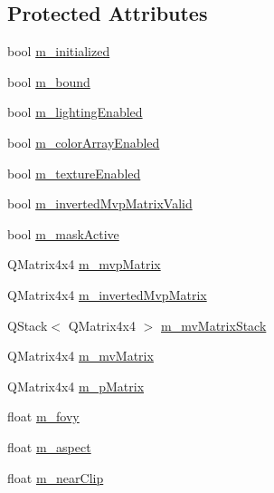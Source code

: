 \subsection*{Protected Attributes}
\begin{DoxyCompactItemize}
\item 
bool \mbox{\hyperlink{class_g_l_e_s_renderer_a2c936870131300b9ed86cf9073747637}{m\+\_\+initialized}}
\item 
bool \mbox{\hyperlink{class_g_l_e_s_renderer_ab4227a6b3394b7392c9a7001fc306ad1}{m\+\_\+bound}}
\item 
bool \mbox{\hyperlink{class_g_l_e_s_renderer_a89a023d2cabec874691841f5ff140bc8}{m\+\_\+lighting\+Enabled}}
\item 
bool \mbox{\hyperlink{class_g_l_e_s_renderer_a71b59ce0e9ae03eba0ed065bae8ecff7}{m\+\_\+color\+Array\+Enabled}}
\item 
bool \mbox{\hyperlink{class_g_l_e_s_renderer_a61680a3953bfb6b22e7131a518b1a5e2}{m\+\_\+texture\+Enabled}}
\item 
bool \mbox{\hyperlink{class_g_l_e_s_renderer_a9c58c18b9b58fb4f49bb1fd79f4a2f51}{m\+\_\+inverted\+Mvp\+Matrix\+Valid}}
\item 
bool \mbox{\hyperlink{class_g_l_e_s_renderer_a8e58a3bbfb5ba75c48cc35b06711131c}{m\+\_\+mask\+Active}}
\item 
Q\+Matrix4x4 \mbox{\hyperlink{class_g_l_e_s_renderer_a878a3ee8fe04d1a56659c78ba5e95f4b}{m\+\_\+mvp\+Matrix}}
\item 
Q\+Matrix4x4 \mbox{\hyperlink{class_g_l_e_s_renderer_af08d271c05f553df400b67685435cb0c}{m\+\_\+inverted\+Mvp\+Matrix}}
\item 
Q\+Stack$<$ Q\+Matrix4x4 $>$ \mbox{\hyperlink{class_g_l_e_s_renderer_a5675ffb62f73dc7ebff3e4aea59db56e}{m\+\_\+mv\+Matrix\+Stack}}
\item 
Q\+Matrix4x4 \mbox{\hyperlink{class_g_l_e_s_renderer_a2f8a5b98999a5ee14551a39e5f005389}{m\+\_\+mv\+Matrix}}
\item 
Q\+Matrix4x4 \mbox{\hyperlink{class_g_l_e_s_renderer_a2fe2ba5157fa87a9eca8eb15f8097fb5}{m\+\_\+p\+Matrix}}
\item 
float \mbox{\hyperlink{class_g_l_e_s_renderer_abd7cabc787ad5c787b54ed2d47412df8}{m\+\_\+fovy}}
\item 
float \mbox{\hyperlink{class_g_l_e_s_renderer_a719e99de6bb7e5af3a5fcae041fdefda}{m\+\_\+aspect}}
\item 
float \mbox{\hyperlink{class_g_l_e_s_renderer_ab29bf2e72c2d91883b1ad3f3e8351940}{m\+\_\+near\+Clip}}
\item 

\end{DoxyCompactItemize}
